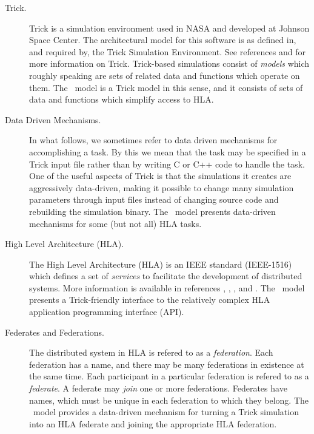 \begin{description}
\item[Trick.]
Trick is a simulation environment used in NASA and developed at
Johnson Space Center.
The architectural model for this software is as defined in, and
required by, the Trick Simulation Environment. 
See references \cite{Trick:Documentation} and \cite{Trick:Tutorial}
for more information on Trick.
Trick-based simulations consist of {\em models} which roughly speaking
are sets of related data and functions which operate on them.
The \TrickHLA\ model is a Trick model in this sense,
and it consists of sets of data and functions which simplify access to HLA.

\item[Data Driven Mechanisms.]
\label{sec:data-driven-mechanisms}
In what follows,
we sometimes refer to data driven mechanisms for accomplishing a task.
By this we mean that the task may be specified in a Trick input file
rather than by writing C or C++ code to handle the task.
One of the useful aspects of Trick is that the simulations it creates are
aggressively data-driven, making it possible to change many simulation 
parameters through input files instead of changing source code and rebuilding
the simulation binary.
The \TrickHLA\ model presents data-driven mechanisms for some (but not all)
HLA tasks.

\item[High Level Architecture (HLA).]
The High Level Architecture (HLA) is an IEEE standard (IEEE-1516)
which defines a set of {\em services} to facilitate the development
of distributed systems.
More information is available in references
\cite{IEEE1516:FRAMEWORK}, \cite{IEEE1516:API}, \cite{IEEE1516:OMT}, and
\cite{IEEE1730:DSEEP}.
The \TrickHLA\ model presents a Trick-friendly interface to the relatively
complex HLA application programming interface (API).

\item[Federates and Federations.]
The distributed system in HLA is refered to as a {\em federation}. 
Each federation has a name, and there may be many federations in existence
at the same time.
Each participant in a particular federation is refered to as a {\em federate}.
A federate may {\em join} one or more federations.
Federates have names, which must be unique in each federation to which they belong.
The \TrickHLA\ model provides a data-driven mechanism for turning a Trick
simulation into an HLA federate and joining the appropriate HLA federation.


\end{description}
